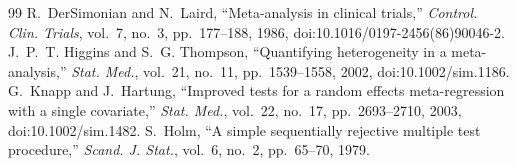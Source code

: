 \documentclass[conference]{IEEEtran}
\begin{document}
\begin{thebibliography}{99}
 R.~DerSimonian and N.~Laird, ``Meta-analysis in clinical trials,'' \emph{Control. Clin. Trials}, vol.~7, no.~3, pp.~177--188, 1986, doi:10.1016/0197-2456(86)90046-2.
 J.~P.~T. Higgins and S.~G. Thompson, ``Quantifying heterogeneity in a meta-analysis,'' \emph{Stat. Med.}, vol.~21, no.~11, pp.~1539--1558, 2002, doi:10.1002/sim.1186.
 G.~Knapp and J.~Hartung, ``Improved tests for a random effects meta-regression with a single covariate,'' \emph{Stat. Med.}, vol.~22, no.~17, pp.~2693--2710, 2003, doi:10.1002/sim.1482.
 S.~Holm, ``A simple sequentially rejective multiple test procedure,'' \emph{Scand. J. Stat.}, vol.~6, no.~2, pp.~65--70, 1979.
\end{thebibliography}
\end{document}
